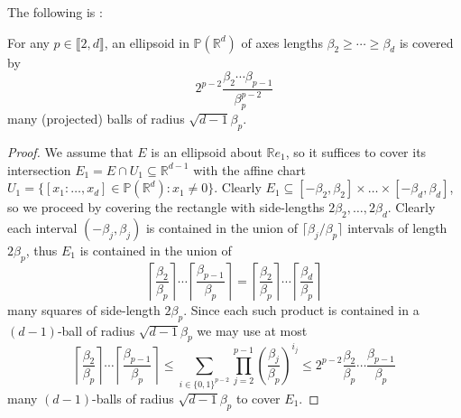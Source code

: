 \documentclass{report}
\begin{document}
The following is \cite[Lemma 3.7]{pozzetti_anosov_2023}:
\begin{lemma}\label{lem:ellipsoid_covering}
For any $p \in \llbracket 2, d \rrbracket$, an ellipsoid in $\mathbb P(\mathbb R^d)$ of axes lengths $\beta_2 \geq \cdots \geq \beta_d$ is covered by
\[
    2^{p - 2} \frac{\beta_2 \cdots \beta_{p-1}}{\beta_p^{p-2}}
\]
many (projected) balls of radius $\sqrt{d-1} \beta_p$.
\end{lemma}
\begin{proof}
We assume that $E$ is an ellipsoid about $\mathbb R e_1$, so it suffices to cover its intersection $E_1 = E \cap U_1 \subseteq \mathbb R^{d-1}$ with the affine chart $U_1 = \{ [x_1: \ldots, x_d ] \in \mathbb P(\mathbb R^d) : x_1 \neq 0 \}$.
Clearly $E_1 \subseteq [-\beta_2, \beta_2] \times \ldots \times [-\beta_d, \beta_d]$, so we proceed by covering the rectangle with side-lengths $2\beta_2, \ldots, 2\beta_d$.
Clearly each interval $(-\beta_j, \beta_j)$ is contained in the union of $\lceil \beta_j/\beta_p \rceil$ intervals of length $2\beta_p$, thus $E_1$ is contained in the union of
\[
    \left\lceil \frac{\beta_2}{\beta_p} \right\rceil \cdots \left\lceil \frac{\beta_{p-1}}{\beta_p} \right\rceil =
    \left\lceil \frac{\beta_2}{\beta_p} \right\rceil \cdots \left\lceil \frac{\beta_d}{\beta_p} \right\rceil
\]
many squares of side-length $2\beta_p$.
Since each such product is contained in a $(d-1)$-ball of radius $\sqrt{d-1} \beta_p$ we may use at most
\[
    \left\lceil \frac{\beta_2}{\beta_p} \right\rceil \cdots \left\lceil \frac{\beta_{p-1}}{\beta_p} \right\rceil \leq
    \sum_{i \in \{ 0,1 \}^{p-2} } \prod_{j = 2}^{p-1} \left( \frac{\beta_j}{\beta_p} \right)^{i_j} \leq 2^{p-2} \frac{\beta_2}{\beta_p} \cdots \frac{\beta_{p-1}}{\beta_p}
\]
many $(d-1)$-balls of radius $\sqrt{d-1}\beta_p$ to cover $E_1$.
\end{proof}
\end{document}
